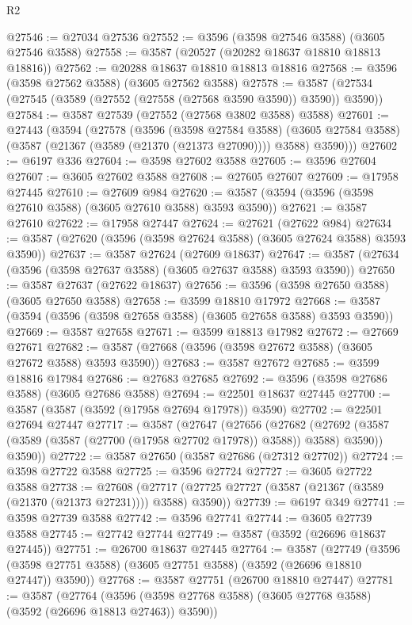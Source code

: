 \begin{lexlean}{R2}
\begin{coremodule}
@27546 := @27034 @27536
@27552 := @3596 (@3598 @27546 @3588) (@3605 @27546 @3588)
@27558 := @3587 (@20527 (@20282 @18637 @18810 @18813 @18816))
@27562 := @20288 @18637 @18810 @18813 @18816
@27568 := @3596 (@3598 @27562 @3588) (@3605 @27562 @3588)
@27578 := @3587 (@27534 (@27545 (@3589 (@27552 (@27558 (@27568 @3590 @3590)) @3590)) @3590))
@27584 := @3587 @27539 (@27552 (@27568 @3802 @3588) @3588)
@27601 := @27443
    (@3594
      (@27578
        (@3596
          (@3598 @27584 @3588)
          (@3605 @27584 @3588)
          (@3587 (@21367 (@3589 (@21370 (@21373 @27090)))) @3588)
          @3590)))
@27602 := @6197 @336
@27604 := @3598 @27602 @3588
@27605 := @3596 @27604
@27607 := @3605 @27602 @3588
@27608 := @27605 @27607
@27609 := @17958 @27445
@27610 := @27609 @984
@27620 := @3587 (@3594 (@3596 (@3598 @27610 @3588) (@3605 @27610 @3588) @3593 @3590))
@27621 := @3587 @27610
@27622 := @17958 @27447
@27624 := @27621 (@27622 @984)
@27634 := @3587 (@27620 (@3596 (@3598 @27624 @3588) (@3605 @27624 @3588) @3593 @3590))
@27637 := @3587 @27624 (@27609 @18637)
@27647 := @3587 (@27634 (@3596 (@3598 @27637 @3588) (@3605 @27637 @3588) @3593 @3590))
@27650 := @3587 @27637 (@27622 @18637)
@27656 := @3596 (@3598 @27650 @3588) (@3605 @27650 @3588)
@27658 := @3599 @18810 @17972
@27668 := @3587 (@3594 (@3596 (@3598 @27658 @3588) (@3605 @27658 @3588) @3593 @3590))
@27669 := @3587 @27658
@27671 := @3599 @18813 @17982
@27672 := @27669 @27671
@27682 := @3587 (@27668 (@3596 (@3598 @27672 @3588) (@3605 @27672 @3588) @3593 @3590))
@27683 := @3587 @27672
@27685 := @3599 @18816 @17984
@27686 := @27683 @27685
@27692 := @3596 (@3598 @27686 @3588) (@3605 @27686 @3588)
@27694 := @22501 @18637 @27445
@27700 := @3587 (@3587 (@3592 (@17958 @27694 @17978)) @3590)
@27702 := @22501 @27694 @27447
@27717 := @3587
    (@27647
      (@27656
        (@27682 (@27692 (@3587 (@3589 (@3587 (@27700 (@17958 @27702 @17978)) @3588)) @3588) @3590))
        @3590))
@27722 := @3587 @27650 (@3587 @27686 (@27312 @27702))
@27724 := @3598 @27722 @3588
@27725 := @3596 @27724
@27727 := @3605 @27722 @3588
@27738 := @27608
    (@27717 (@27725 @27727 (@3587 (@21367 (@3589 (@21370 (@21373 @27231)))) @3588) @3590))
@27739 := @6197 @349
@27741 := @3598 @27739 @3588
@27742 := @3596 @27741
@27744 := @3605 @27739 @3588
@27745 := @27742 @27744
@27749 := @3587 (@3592 (@26696 @18637 @27445))
@27751 := @26700 @18637 @27445
@27764 := @3587
    (@27749 (@3596 (@3598 @27751 @3588) (@3605 @27751 @3588) (@3592 (@26696 @18810 @27447)) @3590))
@27768 := @3587 @27751 (@26700 @18810 @27447)
@27781 := @3587
    (@27764 (@3596 (@3598 @27768 @3588) (@3605 @27768 @3588) (@3592 (@26696 @18813 @27463)) @3590))

\end{coremodule}
\end{lexlean}
